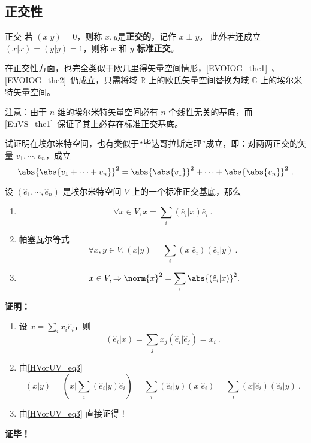 \subsection{正交性}
\begin{definition}{正交}
若 $(  x|  y)=0$，则称 $  x,  y$是\textbf{正交的}，记作 $  x\perp  y$。
此外若还成立 $(  x|  x)=(  y|  y)=1$，则称 $  x$ 和 $  y$ \textbf{标准正交}。
\end{definition}
在正交性方面，也完全类似于欧几里得矢量空间情形，\autoref{EVOIOG_the1}~、\autoref{EVOIOG_the2}~仍成立，只需将域 $\mathbb{R}$ 上的欧氏矢量空间替换为域 $\mathbb{C}$ 上的埃尔米特矢量空间。

注意：由于 $n$ 维的埃尔米特矢量空间必有 $n$ 个线性无关的基底，而\autoref{EuVS_the1}~保证了其上必存在标准正交基底。
\begin{example}{}
试证明在埃尔米特空间，也有类似于“毕达哥拉斯定理”成立，即：对两两正交的矢量 $  v_1,\cdots,  v_n$，成立
\begin{equation}
\abs{\abs{  v_1+\cdots+  v_n}}^2=\abs{\abs{  v_1}}^2+\cdots+\abs{\abs{  v_n}}^2~.
\end{equation}
\end{example}

\begin{theorem}{}
设 $(\hat e_1,\cdots, \hat e_n)$ 是埃尔米特空间 $V$ 上的一个标准正交基底，那么
\begin{enumerate}
\item \begin{equation}\label{HVorUV_eq3}
\forall  x\in V,  x=\sum_{i}( \hat e_i|  x)\hat e_i~.
\end{equation}
\item 帕塞瓦尔等式
\begin{equation}
\forall  x,  y\in V,(  x|  y)=\sum_{i}(  x|\hat e_i)(  \hat e_i|  y)~.
\end{equation}
\item \begin{equation}
\  x\in V,\Rightarrow\norm{  x}^2=\sum_{i}\abs{(  \hat e_i|  x)}^2.
\end{equation}
\end{enumerate}
\end{theorem}
\textbf{证明：}\begin{enumerate}
\item 设 $  x=\sum_{i}x_i 
 \hat e_i$，则
\begin{equation}
( \hat e_i|  x)=\sum_{j}x_j( \hat e_i| \hat e_j)=x_i~.
\end{equation}
\item 由\autoref{HVorUV_eq3} 
\begin{equation}
(  x|  y)=(  x|\sum_{i}( \hat e_i|  y) \hat e_i)=\sum_{i}( \hat e_i|  y)(  x| \hat e_i)=\sum_{i}(  x| \hat e_i)( \hat e_i|  y)~.
\end{equation}
\item 由\autoref{HVorUV_eq3} 直接证得！
\end{enumerate}
\textbf{证毕！}
